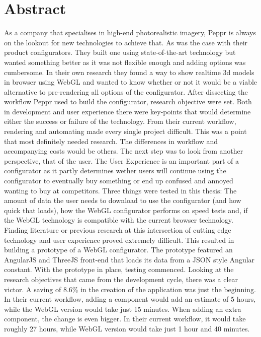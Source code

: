 \chapter*{Abstract}%

As a company that specialises in high-end photorealistic imagery, Peppr is always on the lookout for new technologies to achieve that. As was the case with their product configurators. They built one using state-of-the-art technology but wanted something better as it was not flexible enough and adding options was cumbersome. In their own research they found a way to show realtime 3d models in browser using WebGL and wanted to know whether or not it would be a viable alternative to pre-rendering all options of the configurator. \newline
After dissecting the workflow Peppr used to build the configurator, research objective were set. Both in development and user experience there were key-points that would determine either the success or failure of the technology. From their current workflow, rendering and automating made every single project difficult. This was a point that most definitely needed research. The differences in workflow and accompanying costs would be others.\newline
The next step was to look from another perspective, that of the user. The User Experience is an important part of a configurator as it partly determines wether users will continue using the configurator to eventually buy something or end up confused and annoyed wanting to buy at competitors. Three things were tested in this thesis: The amount of data the user needs to download to use the configurator (and how quick that loads), how the WebGL configurator performs on speed tests and, if the WebGL technology is compatible with the current browser technology. \newline
Finding literature or previous research at this intersection of cutting edge technology and user experience proved extremely difficult. This resulted in building a prototype of a WebGL configurator. The prototype featured an AngularJS and ThreeJS front-end that loads its data from a JSON style Angular constant. With the prototype in place, testing commenced. \newline
Looking at the research objectives that came from the development cycle, there was a clear victor. A saving of 8.6\% in the creation of the application was just the beginning. In their current workflow, adding a component would add an estimate of 5 hours, while the WebGL version would take just 15 minutes. When adding an extra component, the change is even bigger. In their current workflow, it would take roughly 27 hours, while WebGL version would take just 1 hour and 40 minutes. \newline

